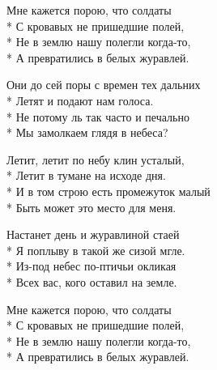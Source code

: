 \medskip

\begin{minipage}{\linewidth}
Мне кажется порою, что солдаты\\*
С кровавых не пришедшие полей,\\*
Не в землю нашу полегли когда-то,\\*
А превратились в белых журавлей.\\
\end{minipage}\par\medskip\nobreak

\medskip

\begin{minipage}{\linewidth}
Они до сей поры с времен тех дальних\\*
Летят и подают нам голоса.\\*
Не потому ль так часто и печально\\*
Мы замолкаем глядя в небеса?\\
\end{minipage}\par\medskip\nobreak

\medskip

\begin{minipage}{\linewidth}
Летит, летит по небу клин усталый,\\*
Летит в тумане на исходе дня.\\*
И в том строю есть промежуток малый\\*
Быть может это место для меня.\\
\end{minipage}\par\medskip\nobreak

\medskip

\begin{minipage}{\linewidth}
Настанет день и журавлиной стаей\\*
Я поплыву в такой же сизой мгле.\\*
Из-под небес по-птичьи окликая\\*
Всех вас, кого оставил на земле.\\
\end{minipage}\par\medskip\nobreak

\medskip

\begin{minipage}{\linewidth}
Мне кажется порою, что солдаты\\*
С кровавых не пришедшие полей,\\*
Не в землю нашу полегли когда-то,\\*
А превратились в белых журавлей.\\
\end{minipage}

